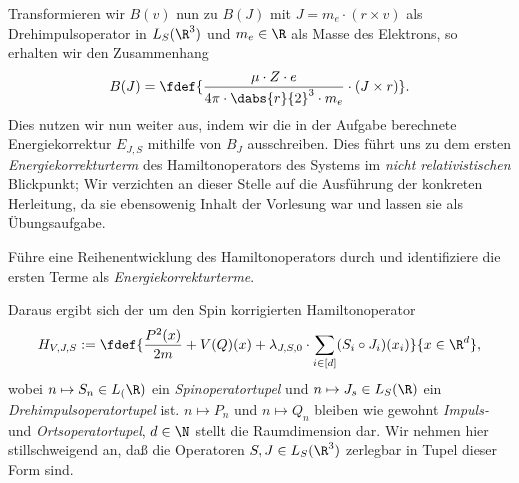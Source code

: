 \documentclass{subfiles}
\begin{document}
    \noindent Transformieren wir $B(v)$ nun zu $B(J)$ mit $J = m_e\cdot (r\times v)$ als Drehimpulsoperator in $L_S(\R^3)$ und $m_e\in\R$ als Masse des Elektrons, so erhalten wir den Zusammenhang 
    \[
        B(J) = \fdef{
            \frac{\mu\cdot Z\cdot e}{4\pi\cdot \dabs{r}{2}^3\cdot m_e}\cdot(J \times r)
        }.
    \]
    Dies nutzen wir nun weiter aus, indem wir die in der Aufgabe  berechnete Energiekorrektur $E_{J,S}$ mithilfe von $B_J$ ausschreiben. Dies führt uns zu dem ersten \emph{Energiekorrekturterm} des Hamiltonoperators des Systems im \emph{nicht relativistischen} Blickpunkt; Wir verzichten an dieser Stelle auf die Ausführung der konkreten Herleitung, da sie ebensowenig Inhalt der Vorlesung war und lassen sie als Übungsaufgabe.
    \begin{Aufgabe}
        \nr{} Führe eine Reihenentwicklung des Hamiltonoperators durch und identifiziere die ersten Terme als \emph{Energiekorrekturterme}.
    \end{Aufgabe}
    \noindent Daraus ergibt sich der um den Spin korrigierten Hamiltonoperator
    \[
        H_{V,J,S}:=\fdef{\frac{P^2(x)}{2m} + V(Q)(x) + \lambda_{J,S,0}\cdot\sum_{i\in[d]}(S_i\circ J_i)(x_i)}{x\in\R^d},
    \]
    wobei $n\mapsto S_n\in L_(\R)$ ein \emph{Spinoperatortupel} und $n\mapsto J_s\in L_S(\R)$ ein \emph{Drehimpulsoperatortupel} ist. $n\mapsto P_n$ und $n\mapsto Q_n$ bleiben wie gewohnt \emph{Impuls-} und \emph{Ortsoperatortupel}, $d\in\N$ stellt die Raumdimension dar. Wir nehmen hier stillschweigend an, daß die Operatoren $S,J\in L_S(\R^3)$ zerlegbar in Tupel dieser Form sind. 
\end{document}
